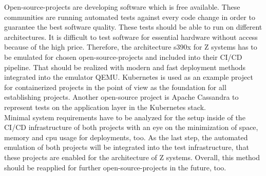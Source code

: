 Open-source-projects are developing software which is free available. These communities are running automated tests against every code change in order to guarantee the best software quality. 
These tests should be able to run on different architectures. It is difficult to test software for essential hardware without access because of the high price. Therefore, the architecture \gls{s390x} for \gls{Z systems} has to be emulated for chosen open-source-projects and included into their \gls{CI/CD} pipeline. That should be realized with modern and fast deployment methods integrated into the \gls{emulator} QEMU. Kubernetes is used as an example project for \gls{containerized} projects in the point of view as the foundation for all establishing projects. Another open-source project is Apache Cassandra to represent tests on the \gls{application layer} in the Kubernetes stack. \\
Minimal system requirements have to be analyzed for the setup inside of the CI/CD infrastructure of both projects with an eye on the minimization of space, memory and cpu usage for deployments, too. As the last step, the automated emulation of both projects will be integrated into the test infrastructure, that these projects are enabled for the architecture of Z systems. Overall, this method should be reapplied for further open-source-projects in the future, too.


